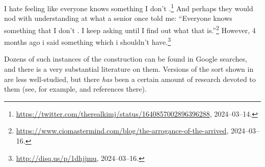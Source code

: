 \documentclass[output=paper,colorlinks,citecolor=brown]{langscibook}
\begin{document}
\begin{exe}
 \ex\label{antecDel}
  \begin{xlist}
 \ex\label{}
    I hate feeling like everyone knows something I don't {\gp}\xspace
    .\footnote{\url{https://twitter.com/therealkimj/status/1640857002896396288}, 2024--03--14.}
 \ex\label{antecDel_a}
    And perhaps they would nod with understanding at what a senior
  once told me: ``Everyone knows something that I don't {\gp}\xspace . I keep
  asking until I find out what that is.''\footnote{
  \url{https://www.ciomastermind.com/blog/the-arrogance-of-the-arrived},
  2024--03--16.}
 \ex\label{}
    However, 4 months ago i said something which i shouldn't have.\footnote{
    \url{http://disq.us/p/1dhjjmu}, 2024--03--16.}

  \end{xlist}
\end{exe}
Dozens of such instances of the construction can be found in Google
searches, and there is a very substantial literature on them. Versions
of the sort shown in  are less well-studied, but
there \emph{has} been a certain amount of research devoted to them (see, for example,
\citet{schuyler2002} and references there).
\end{document}
